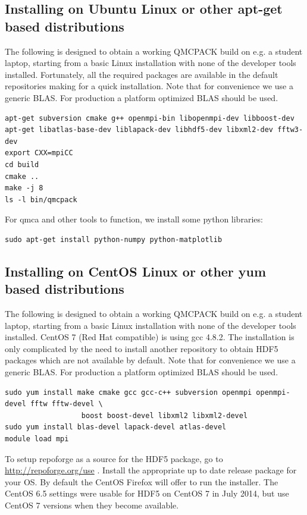 \subsection{Installing on Ubuntu Linux or other apt-get based distributions}

The following is designed to obtain a working QMCPACK build on e.g. a
student laptop, starting from a basic Linux installation with none of
the developer tools installed. Fortunately, all the required packages
are available in the default repositories making for a quick
installation. Note that for convenience we use a generic BLAS. For
production a platform optimized BLAS should be used.

\begin{verbatim}
apt-get subversion cmake g++ openmpi-bin libopenmpi-dev libboost-dev
apt-get libatlas-base-dev liblapack-dev libhdf5-dev libxml2-dev fftw3-dev
export CXX=mpiCC
cd build
cmake ..
make -j 8
ls -l bin/qmcpack
\end{verbatim}

For qmca and other tools to function, we install some python libraries:
\begin{verbatim}
sudo apt-get install python-numpy python-matplotlib
\end{verbatim}

\subsection{Installing on CentOS Linux or other yum based distributions}

The following is designed to obtain a working QMCPACK build on e.g. a
student laptop, starting from a basic Linux installation with none of
the developer tools installed. CentOS 7 (Red Hat compatible) is using
gcc 4.8.2. The installation is only complicated by the need to install
another repository to obtain HDF5 packages which are not available by
default. Note that for convenience we use a generic BLAS. For
production a platform optimized BLAS should be used.

\begin{verbatim}
sudo yum install make cmake gcc gcc-c++ subversion openmpi openmpi-devel fftw fftw-devel \
                  boost boost-devel libxml2 libxml2-devel
sudo yum install blas-devel lapack-devel atlas-devel
module load mpi 
\end{verbatim}

To setup repoforge as a source for the HDF5 package, go to
\url{http://repoforge.org/use} . Install the appropriate up to date
release package for your OS. By default the CentOS Firefox will offer
to run the installer. The CentOS 6.5 settings were usable for HDF5 on
CentOS 7 in July 2014, but use CentOS 7 versions when they become
available.

